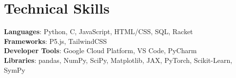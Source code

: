 \documentclass[letterpaper,11pt]{article}
\begin{document}
%
\section{Technical Skills}
\begin{itemize}[leftmargin=0.15in, label={}]
    \small{\item{
    \textbf{Languages}{: Python, C, JavaScript, HTML/CSS, SQL, Racket} \\
    \textbf{Frameworks}{: P5.js, TailwindCSS} \\
    \textbf{Developer Tools}{: Google Cloud Platform, VS Code, PyCharm} \\
    \textbf{Libraries}{: pandas, NumPy, SciPy, Matplotlib, JAX, PyTorch, Scikit-Learn, SymPy}
    }}
\end{itemize}



\end{document}
